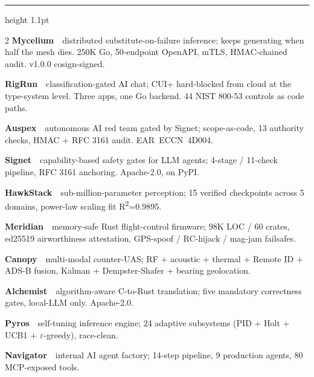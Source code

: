 \documentclass[10pt,letterpaper]{article}
\newcommand{\sectionhead}[1]{%
  \vspace{6pt}{\plexmono\footnotesize\bfseries\color{navy}\MakeUppercase{#1}}%
  \vspace{1pt}\par{\color{teal}\hrule height 1.1pt}\vspace{4pt}}
\newcommand{\sys}[2]{\textbf{\color{navy}#1} \,\textemdash\, #2\par\vspace{1.5pt}}
\newcommand{\mono}[1]{{\plexmono #1}}
\begin{document}
\sectionhead{Core competencies}
{\small
\begin{multicols}{2}
\sys{Mycelium}{distributed substitute-on-failure inference; keeps generating when half the mesh dies. 250K Go, 50-endpoint OpenAPI, mTLS, HMAC-chained audit. \mono{v1.0.0} cosign-signed.}
\sys{RigRun}{classification-gated AI chat; CUI+ hard-blocked from cloud at the type-system level. Three apps, one Go backend. 44 NIST 800-53 controls as code paths.}
\sys{Auspex}{autonomous AI red team gated by Signet; scope-as-code, 13 authority checks, HMAC + RFC 3161 audit. \mbox{EAR ECCN 4D004.}}
\sys{Signet}{capability-based safety gates for LLM agents; 4-stage / 11-check pipeline, RFC 3161 anchoring. Apache-2.0, on PyPI.}
\sys{HawkStack}{sub-million-parameter perception; 15 verified checkpoints across 5 domains, power-law scaling fit \mbox{R\textsuperscript{2}=0.9895.}}
\sys{Meridian}{memory-safe Rust flight-control firmware; 98K LOC / 60 crates, ed25519 airworthiness attestation, GPS-spoof / RC-hijack / mag-jam failsafes.}
\sys{Canopy}{multi-modal counter-UAS; RF + acoustic + thermal + Remote ID + ADS-B fusion, Kalman + Dempster-Shafer + bearing geolocation.}
\sys{Alchemist}{algorithm-aware C-to-Rust translation; five mandatory correctness gates, local-LLM only. Apache-2.0.}
\sys{Pyros}{self-tuning inference engine; 24 adaptive subsystems (PID + Holt + UCB1 + $\varepsilon$-greedy), race-clean.}
\sys{Navigator}{internal AI agent factory; 14-step pipeline, 9 production agents, 80 MCP-exposed tools.}
\end{multicols}}
\end{document}
